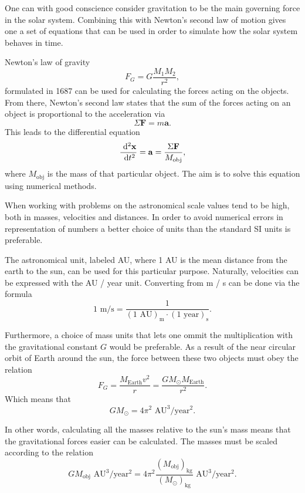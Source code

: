One can with good conscience consider gravitation to be the main
governing force in the solar system. Combining this with Newton's
second law of motion gives one a set of equations that can be used
in order to simulate how the solar system behaves in time.

Newton's law of gravity \[ F_G = G\frac{M_1 M_2}{r^2}, \]
formulated in 1687 can be used for calculating the forces acting on
the objects. From there, Newton's second law states that the sum of
the forces acting on an object is proportional to the acceleration
via \[ \Sigma \mathbf{F} = m \mathbf{a}. \] This leads to the
differential equation \[ \frac{\ \mathrm{d}^2 \mathbf{x}}{\ \mathrm{d}t^2} =
\mathbf{a} = \frac{\Sigma \mathbf{F}}{M_{\text{obj}}}, \] where
$M_{\text{obj}}$ is the mass of that particular object. The aim is
to solve this equation using numerical methods.

When working with problems on the astronomical scale values tend to
be high, both in masses, velocities and distances. In order to
avoid numerical errors in representation of numbers a better choice
of units than the standard SI units is preferable.

The astronomical unit, labeled AU, where 1 AU is the mean distance
from the earth to the sun, can be used for this particular purpose.
Naturally, velocities can be expressed with the AU / year unit.
Converting from m / s can be done via the formula \[1 \text{ m/s} =
\frac{1}{(1 \text{ AU})_{\text{m}} \cdot (1 \text{ year})_{\text{s}}}. \]

Furthermore, a choice of mass units that lets one ommit the
multiplication with the gravitational constant $G$ would be
preferable. As a result of the near circular orbit of Earth around
the sun, the force between these two objects must obey the relation
\[ F_G = \frac{M_{\text{Earth}}v^2}{r} = \frac{G M_{\odot}
M_{\text{Earth}}}{r^2}. \] Which means that \[G M_{\odot} = 4\pi^2
\text{ AU}^3 / \text{year}^2. \]

In other words, calculating all the masses relative to the sun's
mass means that the gravitational forces easier can be calculated.
The masses must be scaled according to the relation \[ G
    M_{\text{obj}} \text{ AU}^3 / \text{year}^2 = 4\pi^2
    \frac{(M_{\text{obj}})_{\text{kg}}}{(M_{\odot})_{\text{kg}}} \text{ AU}^3
/ \text{year}^2. \]

